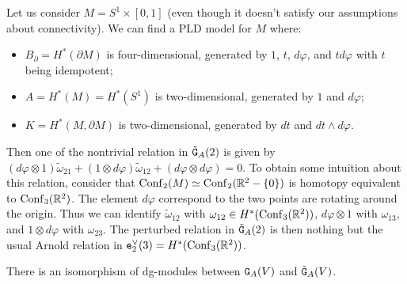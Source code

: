 \begin{example}
  Let us consider $M = S^{1} \times [0,1]$ (even though it doesn't satisfy our assumptions about connectivity).
  We can find a PLD model for $M$ where:
  \begin{itemize}
  \item $B_{\partial} = H^{*}(\partial M)$ is four-dimensional, generated by $1$, $t$, $d\varphi$, and $t d\varphi$ with $t$ being idempotent;
  \item $A = H^{*}(M) = H^{*}(S^{1})$ is two-dimensional, generated by $1$ and $d\varphi$;
  \item $K = H^{*}(M, \partial M)$ is two-dimensional, generated by $dt$ and $dt \wedge d\varphi$.
  \end{itemize}

  Then one of the nontrivial relation in $\GGt{A}(2)$ is given by $(d\varphi \otimes 1) \tilde\omega_{21} + (1 \otimes d\varphi) \tilde\omega_{12} + (d\varphi \otimes d\varphi) = 0$.
  To obtain some intuition about this relation, consider that $\Conf_{2}(M) \simeq \Conf_{2}(\R^{2} - \{0\})$ is homotopy equivalent to $\Conf_{3}(\R^{2})$.
  The element $d\varphi$ correspond to the two points are rotating around the origin.
  Thus we can identify $\tilde\omega_{12}$ with $\omega_{12} \in H^{*}(\Conf_{3}(\R^{2}))$, $d\varphi \otimes 1$ with $\omega_{13}$, and $1 \otimes d\varphi$ with $\omega_{23}$.
  The perturbed relation in $\GGt{A}(2)$ is then nothing but the usual Arnold relation in $\enV[2](3) = H^{*}(\Conf_{3}(\R^{2}))$.
\end{example}

\begin{proposition}
  There is an isomorphism of dg-modules between $\GG{A}(V)$ and $\GGt{A}(V)$.
\end{proposition}

